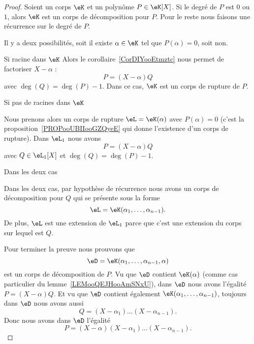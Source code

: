 \begin{proof}
    Soient un corps \( \eK\) et un polynôme \( P\in \eK[X]\). Si le degré de \( P\) est \( 0\) ou \( 1\), alors \( \eK\) est un corps de décomposition pour \( P\). Pour le reste nous faisons une récurrence sur le degré de \( P\).

    Il y a deux possibilités, soit il existe \( \alpha\in \eK\) tel que \( P(\alpha)=0\), soit non.

    \begin{subproof}
        \item[Si racine dans \( \eK\)]
            Alors le corollaire~\ref{CorDIYooEtmztc} nous permet de factoriser \( X-\alpha\) :
            \begin{equation}
                P=(X-\alpha)Q
            \end{equation}
            avec \( \deg(Q)=\deg(P)-1\). Dans ce cas, \( \eK\) est un corps de rupture de \( P\).

        \item[Si pas de racines dans \( \eK\)]

            Nous prenons alors un corps de rupture \( \eL=\eK(\alpha)\) avec \( P(\alpha)=0\) (c'est la proposition~\ref{PROPooUBIIooGZQyeE} qui donne l'existence d'un corps de rupture). Dans \( \eL_1\) nous avons
            \begin{equation}
                P=(X-\alpha)Q
            \end{equation}
            avec \( Q\in \eL_1[X]\) et \( \deg(Q)=\deg(P)-1\).

        \item[Dans les deux cas]

            Dans les deux cas, par hypothèse de récurrence nous avons un corps de décomposition pour \( Q\) qui se présente sous la forme
            \begin{equation}
                \eL=\eK(\alpha_1,\ldots, \alpha_{n-1}).
            \end{equation}
            De plus, \( \eL\) est une extension de \( \eL_1\) parce que c'est une extension du corps sur lequel est \( Q\).

    \end{subproof}
    Pour terminer la preuve nous prouvons que
    \begin{equation}
        \eD=\eK(\alpha_1,\ldots, \alpha_{n-1},\alpha)
    \end{equation}
    est un corps de décomposition de \( P\). Vu que \( \eD\) contient \( \eK(\alpha)\) (comme cas particulier du lemme~\ref{LEMooQEJHooAmSNxU}), dans \( \eD\) nous avons l'égalité \( P=(X-\alpha)Q\). Et vu que \( \eD\) contient également \( \eK(\alpha_1,\ldots, \alpha_{n-1})\), toujours dans \( \eD\) nous avons aussi
    \begin{equation}
         Q=(X-\alpha_1)\ldots(X-\alpha_{n-1}).
    \end{equation}
    Donc nous avons dans \( \eD\) l'égalité
    \begin{equation}
        P=(X-\alpha)(X-\alpha_1)\ldots (X-\alpha_{n-1}).
    \end{equation}
\end{proof}

